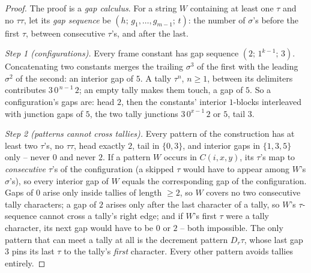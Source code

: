 \documentclass[runningheads,envcountsect]{llncs}
\begin{document}
\begin{proof}
    The proof is a \emph{gap calculus}. For a string $W$ containing at
    least one $\tau$ and no $\tau\tau$, let its \emph{gap sequence} be
    $(h;\, g_1, \dots, g_{m-1};\, t)$: the number of $\sigma$'s before
    the first $\tau$, between consecutive $\tau$'s, and after the last.

    \emph{Step 1 (configurations).} Every frame constant has gap
    sequence $(2;\, 1^{k-1};\, 3)$. Concatenating two constants merges
    the trailing $\sigma^3$ of the first with the leading $\sigma^2$ of
    the second: an interior gap of $5$. A tally $\tau^{n}$, $n \geq 1$,
    between its delimiters contributes $3\,0^{\,n-1}\,2$; an empty tally
    makes them touch, a gap of $5$. So a configuration's gaps are: head
    $2$, then the constants' interior $1$-blocks interleaved with
    junction gaps of $5$, the two tally junctions $3\,0^{x-1}\,2$ or
    $5$, tail $3$.

    \emph{Step 2 (patterns cannot cross tallies).} Every pattern of
    the construction has at least two $\tau$'s, no $\tau\tau$, head
    exactly $2$, tail in $\{0, 3\}$, and interior gaps in $\{1, 3, 5\}$
    only -- never $0$ and never $2$. If a pattern $W$ occurs in
    $C(i,x,y)$, its $\tau$'s map to \emph{consecutive} $\tau$'s of the
    configuration (a skipped $\tau$ would have to appear among $W$'s
    $\sigma$'s), so every interior gap of $W$ equals the corresponding
    gap of the configuration. Gaps of $0$ arise only inside tallies of
    length $\geq 2$, so $W$ covers no two consecutive tally characters;
    a gap of $2$ arises only after the last character of a tally, so
    $W$'s $\tau$-sequence cannot cross a tally's right edge; and if
    $W$'s first $\tau$ were a tally character, its next gap would have
    to be $0$ or $2$ -- both impossible. The only pattern that can meet
    a tally at all is the decrement pattern $D_r\tau$, whose last gap
    $3$ pins its last $\tau$ to the tally's \emph{first} character.
    Every other pattern avoids tallies entirely.


\end{proof}
\end{document}
